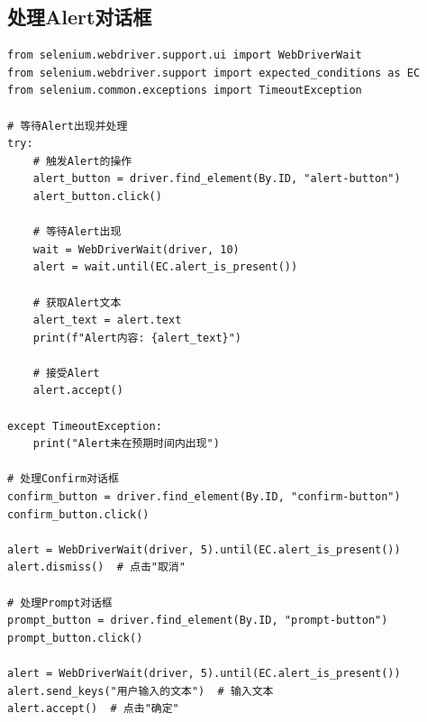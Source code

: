 \subsection{处理Alert对话框}

\begin{lstlisting}[style=demostyle,numbers=none]
from selenium.webdriver.support.ui import WebDriverWait
from selenium.webdriver.support import expected_conditions as EC
from selenium.common.exceptions import TimeoutException

# 等待Alert出现并处理
try:
    # 触发Alert的操作
    alert_button = driver.find_element(By.ID, "alert-button")
    alert_button.click()
    
    # 等待Alert出现
    wait = WebDriverWait(driver, 10)
    alert = wait.until(EC.alert_is_present())
    
    # 获取Alert文本
    alert_text = alert.text
    print(f"Alert内容: {alert_text}")
    
    # 接受Alert
    alert.accept()
    
except TimeoutException:
    print("Alert未在预期时间内出现")

# 处理Confirm对话框
confirm_button = driver.find_element(By.ID, "confirm-button")
confirm_button.click()

alert = WebDriverWait(driver, 5).until(EC.alert_is_present())
alert.dismiss()  # 点击"取消"

# 处理Prompt对话框
prompt_button = driver.find_element(By.ID, "prompt-button")
prompt_button.click()

alert = WebDriverWait(driver, 5).until(EC.alert_is_present())
alert.send_keys("用户输入的文本")  # 输入文本
alert.accept()  # 点击"确定"
\end{lstlisting}